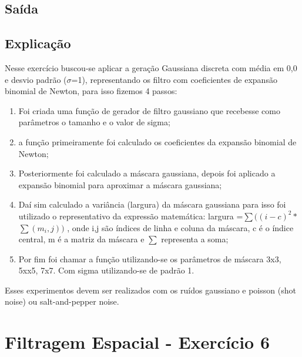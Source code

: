 \documentclass[10pt,a4paper]{article}
\begin{document}


\subsection{Saída}



\subsection{Explicação}

\begin{flushleft}
Nesse exercício buscou-se aplicar a geração Gaussiana discreta com média em 0,0 e desvio padrão {(\(\sigma\)=1)}, representando os filtro com coeficientes de expansão binomial de Newton, para isso fizemos 4 passos: 
\end{flushleft}

\begin{enumerate}[label=\alph*.]
   \item Foi criada uma função de gerador de filtro gaussiano que recebesse como parâmetros o tamanho e o valor de sigma;
   \item a função primeiramente foi calculado os coeficientes da expansão binomial de Newton;
   \item Posteriormente foi calculado a máscara gaussiana, depois foi aplicado a expansão binomial para aproximar a máscara gaussiana;
   \item Daí sim calculado a variância (largura) da máscara gaussiana para isso foi utilizado o representativo da expressão matemática: largura =\(\sum{((i - c)^2 *}\) \(\sum{(m_i,j))}\) , onde i,j são índices de linha e coluna da máscara, c é o índice central, m é a matriz da máscara e \(\sum\) representa a soma;
   \item Por fim foi chamar a função utilizando-se os parâmetros de máscara 3x3, 5xx5, 7x7. Com sigma utilizando-se de padrão 1.
\end{enumerate}

\begin{flushleft}
Esses experimentos devem ser realizados com os ruídos gaussiano e poisson (shot noise) ou salt-and-pepper noise. 
\end{flushleft}

\pagebreak

\section{Filtragem Espacial - Exercício 6}
\end{document}
